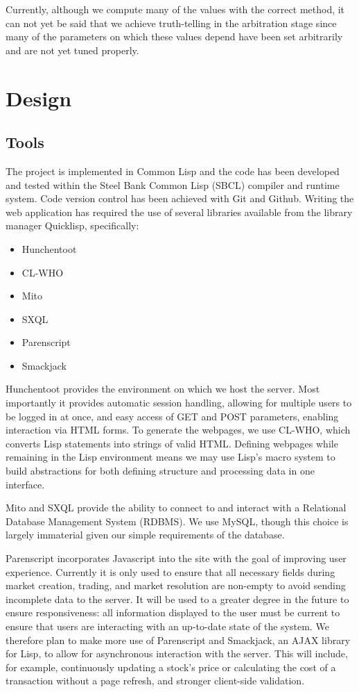 \documentclass[10pt,a4paper]{article}
\theoremstyle{plain}
\theoremstyle{definition}
\begin{document}
Currently, although we compute many of the values with the correct method, it
can not yet be said that we achieve truth-telling in the arbitration stage
since many of the parameters on which these values depend have been set
arbitrarily and are not yet tuned properly.

\section{Design}

\label{sec:design}

\subsection{Tools}

The project is implemented in Common Lisp and the code has been developed and
tested within the Steel Bank Common Lisp (SBCL) compiler and runtime system.
Code version control has been achieved with Git and Github.  Writing the web
application has required the use of several libraries available from the
library manager Quicklisp, specifically:

\begin{itemize}
	\itemsep0em
	\item Hunchentoot
	\item CL-WHO
	\item Mito
	\item SXQL
	\item Parenscript
	\item Smackjack
\end{itemize}

Hunchentoot provides the environment on which we host the server. Most
importantly it provides automatic session handling, allowing for multiple users
to be logged in at once, and easy access of GET and POST parameters, enabling
interaction via HTML forms. To generate the webpages, we use CL-WHO, which
converts Lisp statements into strings of valid HTML. Defining webpages while
remaining in the Lisp environment means we may use Lisp's macro system to build
abstractions for both defining structure and processing data in one interface.

Mito and SXQL provide the ability to connect to and interact with a Relational
Database Management System (RDBMS). We use MySQL, though this choice is largely
immaterial given our simple requirements of the database.

Parenscript incorporates Javascript into the site with the goal of improving
user experience. Currently it is only used to ensure that all necessary fields
during market creation, trading, and market resolution are non-empty to avoid
sending incomplete data to the server. It will be used to a greater degree in
the future to ensure responsiveness: all information displayed to the user must
be current to ensure that users are interacting with an up-to-date state of the
system. We therefore plan to make more use of Parenscript and Smackjack, an
AJAX library for Lisp, to allow for asynchronous interaction with the server.
This will include, for example, continuously updating a stock's price or
calculating the cost of a transaction without a page refresh, and stronger
client-side validation.
\end{document}
